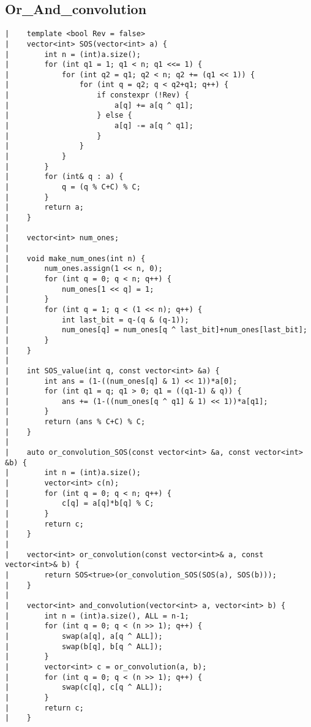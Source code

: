 \documentclass[a4paper, 10pt]{article}
\begin{document}
\begin{center}
\section*{Or\_And\_convolution}
\begin{verbatim}
|    template <bool Rev = false>
|    vector<int> SOS(vector<int> a) {
|        int n = (int)a.size();
|        for (int q1 = 1; q1 < n; q1 <<= 1) {
|            for (int q2 = q1; q2 < n; q2 += (q1 << 1)) {
|                for (int q = q2; q < q2+q1; q++) {
|                    if constexpr (!Rev) {
|                        a[q] += a[q ^ q1];
|                    } else {
|                        a[q] -= a[q ^ q1];
|                    }
|                }
|            }
|        }
|        for (int& q : a) {
|            q = (q % C+C) % C;
|        }
|        return a;
|    }
|    
|    vector<int> num_ones;
|    
|    void make_num_ones(int n) {
|        num_ones.assign(1 << n, 0);
|        for (int q = 0; q < n; q++) {
|            num_ones[1 << q] = 1;
|        }
|        for (int q = 1; q < (1 << n); q++) {
|            int last_bit = q-(q & (q-1));
|            num_ones[q] = num_ones[q ^ last_bit]+num_ones[last_bit];
|        }
|    }
|    
|    int SOS_value(int q, const vector<int> &a) {
|        int ans = (1-((num_ones[q] & 1) << 1))*a[0];
|        for (int q1 = q; q1 > 0; q1 = ((q1-1) & q)) {
|            ans += (1-((num_ones[q ^ q1] & 1) << 1))*a[q1];
|        }
|        return (ans % C+C) % C;
|    }
|    
|    auto or_convolution_SOS(const vector<int> &a, const vector<int> &b) {
|        int n = (int)a.size();
|        vector<int> c(n);
|        for (int q = 0; q < n; q++) {
|            c[q] = a[q]*b[q] % C;
|        }
|        return c;
|    }
|    
|    vector<int> or_convolution(const vector<int>& a, const vector<int>& b) {
|        return SOS<true>(or_convolution_SOS(SOS(a), SOS(b)));
|    }
|    
|    vector<int> and_convolution(vector<int> a, vector<int> b) {
|        int n = (int)a.size(), ALL = n-1;
|        for (int q = 0; q < (n >> 1); q++) {
|            swap(a[q], a[q ^ ALL]);
|            swap(b[q], b[q ^ ALL]);
|        }
|        vector<int> c = or_convolution(a, b);
|        for (int q = 0; q < (n >> 1); q++) {
|            swap(c[q], c[q ^ ALL]);
|        }
|        return c;
|    }
\end{verbatim}


\end{center}
\end{document}
